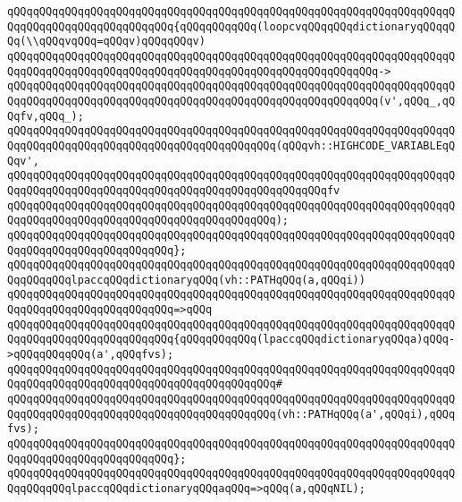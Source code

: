 \verb|qQQqqQQqqQQqqQQqqQQqqQQqqQQqqQQqqQQqqQQqqQQqqQQqqQQqqQQqqQQqqQQqqQQqqQQqqQQqqQQqqQQqqQQqqQQqqQQq{qQQqqQQqqQQq(loopcvqQQqqQQqdictionaryqQQqqQQq(\\qQQqvqQQq=qQQqv)qQQqqQQqv)|\newline
\verb|qQQqqQQqqQQqqQQqqQQqqQQqqQQqqQQqqQQqqQQqqQQqqQQqqQQqqQQqqQQqqQQqqQQqqQQqqQQqqQQqqQQqqQQqqQQqqQQqqQQqqQQqqQQqqQQqqQQqqQQqqQQqqQQq->|\newline
\verb|qQQqqQQqqQQqqQQqqQQqqQQqqQQqqQQqqQQqqQQqqQQqqQQqqQQqqQQqqQQqqQQqqQQqqQQqqQQqqQQqqQQqqQQqqQQqqQQqqQQqqQQqqQQqqQQqqQQqqQQqqQQqqQQq(v',qQQq_,qQQqfv,qQQq_);|\newline
\newline
\verb|qQQqqQQqqQQqqQQqqQQqqQQqqQQqqQQqqQQqqQQqqQQqqQQqqQQqqQQqqQQqqQQqqQQqqQQqqQQqqQQqqQQqqQQqqQQqqQQqqQQqqQQqqQQqqQQq(qQQqvh::HIGHCODE_VARIABLEqQQqv',|\newline
\verb|qQQqqQQqqQQqqQQqqQQqqQQqqQQqqQQqqQQqqQQqqQQqqQQqqQQqqQQqqQQqqQQqqQQqqQQqqQQqqQQqqQQqqQQqqQQqqQQqqQQqqQQqqQQqqQQqqQQqqQQqfv|\newline
\verb|qQQqqQQqqQQqqQQqqQQqqQQqqQQqqQQqqQQqqQQqqQQqqQQqqQQqqQQqqQQqqQQqqQQqqQQqqQQqqQQqqQQqqQQqqQQqqQQqqQQqqQQqqQQqqQQq);|\newline
\verb|qQQqqQQqqQQqqQQqqQQqqQQqqQQqqQQqqQQqqQQqqQQqqQQqqQQqqQQqqQQqqQQqqQQqqQQqqQQqqQQqqQQqqQQqqQQqqQQq};|\newline
\newline
\verb|qQQqqQQqqQQqqQQqqQQqqQQqqQQqqQQqqQQqqQQqqQQqqQQqqQQqqQQqqQQqqQQqqQQqqQQqqQQqqQQqlpaccqQQqdictionaryqQQq(vh::PATHqQQq(a,qQQqi))|\newline
\verb|qQQqqQQqqQQqqQQqqQQqqQQqqQQqqQQqqQQqqQQqqQQqqQQqqQQqqQQqqQQqqQQqqQQqqQQqqQQqqQQqqQQqqQQqqQQqqQQq=>qQQq|\newline
\verb|qQQqqQQqqQQqqQQqqQQqqQQqqQQqqQQqqQQqqQQqqQQqqQQqqQQqqQQqqQQqqQQqqQQqqQQqqQQqqQQqqQQqqQQqqQQqqQQq{qQQqqQQqqQQq(lpaccqQQqdictionaryqQQqa)qQQq->qQQqqQQqqQQq(a',qQQqfvs);|\newline
\verb|qQQqqQQqqQQqqQQqqQQqqQQqqQQqqQQqqQQqqQQqqQQqqQQqqQQqqQQqqQQqqQQqqQQqqQQqqQQqqQQqqQQqqQQqqQQqqQQqqQQqqQQqqQQqqQQq#|\newline
\verb|qQQqqQQqqQQqqQQqqQQqqQQqqQQqqQQqqQQqqQQqqQQqqQQqqQQqqQQqqQQqqQQqqQQqqQQqqQQqqQQqqQQqqQQqqQQqqQQqqQQqqQQqqQQqqQQq(vh::PATHqQQq(a',qQQqi),qQQqfvs);|\newline
\verb|qQQqqQQqqQQqqQQqqQQqqQQqqQQqqQQqqQQqqQQqqQQqqQQqqQQqqQQqqQQqqQQqqQQqqQQqqQQqqQQqqQQqqQQqqQQqqQQq};|\newline
\newline
\verb|qQQqqQQqqQQqqQQqqQQqqQQqqQQqqQQqqQQqqQQqqQQqqQQqqQQqqQQqqQQqqQQqqQQqqQQqqQQqqQQqlpaccqQQqdictionaryqQQqaqQQq=>qQQq(a,qQQqNIL);|\newline
